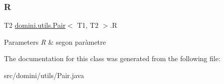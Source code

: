 \subsubsection{\texorpdfstring{R}{R}}
{\footnotesize\ttfamily T2 \hyperlink{classdomini_1_1utils_1_1Pair}{domini.\+utils.\+Pair}$<$ T1, T2 $>$.R\hspace{0.3cm}{\ttfamily [package]}}


\begin{DoxyParams}{Parameters}
{\em R} & segon paràmetre \\
\hline
\end{DoxyParams}


The documentation for this class was generated from the following file\+:\begin{DoxyCompactItemize}
\item 
src/domini/utils/Pair.\+java\end{DoxyCompactItemize}
